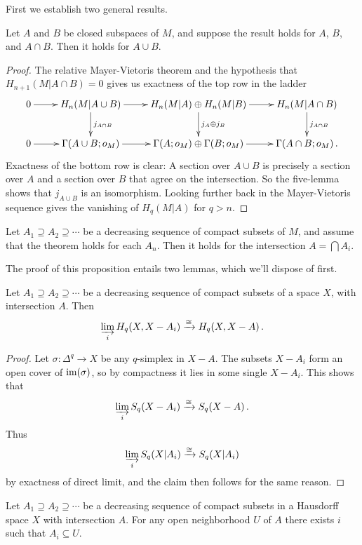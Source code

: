 First we establish two general results.
\begin{prop} 
Let $A$ and $B$ be closed subspaces of $M$, and suppose the result
holds for $A$, $B$, and $A\cap B$. Then it holds for $A\cup B$.
\label{prop-mv}
\end{prop}
\begin{proof}
The relative Mayer-Vietoris theorem and the hypothesis that 
$H_{n+1}(M|A\cap B)=0$ gives us exactness of the top row in the ladder
\[
\xymatrix{
0 \ar[r] & H_n(M|A\cup B) \ar[d]^{j_{A\cap B}} \ar[r] & 
H_n(M|A)\oplus H_n(M|B) \ar[d]^{j_A\oplus j_B} \ar[r] &
H_n(M|A\cap B) \ar[d]^{j_{A\cap B}} \\
0 \ar[r] & \Gamma(A\cup B;o_M) \ar[r] & 
\Gamma(A;o_M)\oplus\Gamma(B;o_M) \ar[r] &
\Gamma(A\cap B;o_M)\,.
}\]
Exactness of the bottom row is clear: A section over $A\cup B$ is precisely
a section over $A$ and a section over $B$ that agree on the intersection.
So the five-lemma shows that $j_{A\cup B}$ is an isomorphism. 
Looking further back in the Mayer-Vietoris sequence gives the vanishing of
$H_q(M|A)$ for $q>n$.  
\end{proof}
\begin{prop}\label{prop-lim}
Let $A_1\supseteq A_2\supseteq\cdots$ be a decreasing sequence
of compact subsets of $M$, and assume that the theorem holds for each $A_n$.
Then it holds for the intersection $A=\bigcap A_i$. 
\end{prop}
The proof of this proposition entails two lemmas, which we'll dispose of first.
\begin{lemma}
\label{lem-lim-cpt}
Let $A_1\supseteq A_2\supseteq\cdots$ be a decreasing sequence of compact
subsets of a space $X$, with intersection $A$. Then 
\[
\varinjlim_iH_q(X,X-A_i)\xrightarrow{\cong}H_q(X,X-A)\,.
\]
\end{lemma}
\begin{proof}
Let $\sigma:\Delta^q\to X$ be any $q$-simplex in $X-A$. The subsets $X-A_i$
form an open cover of $\operatorname{im}(\sigma)$, so by compactness it lies in some
single $X-A_i$. This shows that 
\[
\varinjlim_iS_q(X-A_i)\xrightarrow{\cong}S_q(X-A)\,.
\]
Thus
\[
\varinjlim_iS_q(X|A_i)\xrightarrow{\cong}S_q(X|A_i)
\]
by exactness of direct limit, and the claim then follows for the same reason. 
\end{proof}
\begin{lemma}\label{lem-fip} 
Let $A_1\supseteq A_2\supseteq\cdots$ be a decreasing sequence of 
compact subsets in a Hausdorff space $X$ with intersection $A$. 
For any open neighborhood $U$ of $A$ there exists $i$ such that 
$A_i\subseteq U$.
\end{lemma}
